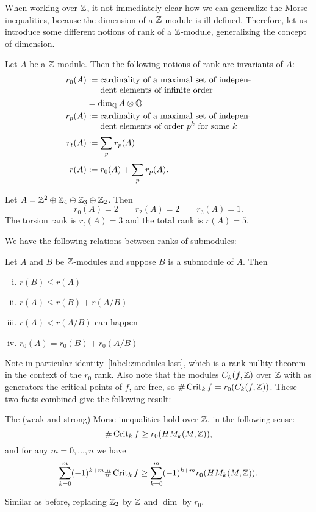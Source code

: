 When working over $\Z$, it not immediately clear how we can generalize the Morse inequalities, because the dimension of a $ \Z$-module is ill-defined.
Therefore, let us introduce some different notions of rank of a $\Z$-module, generalizing the concept of dimension.
\begin{definition}
    Let $A$ be a  $\Z$-module. Then the following notions of rank are invariants of $A$:
    \begin{align*}
        r_0(A) &:= \parbox[t]{6.2cm}{cardinality of a maximal set of independent elements of infinite order}\\[0.3em]
            &= \dim_{\Q} A \otimes \Q\\
        r_p(A) &:= \parbox[t]{6.2cm}{cardinality of a maximal set of independent elements of order $p^{k}$ for some $k$}\\[0.3em]
        r_t(A) &:= \sum_{p} r_p(A)\\[0.3em]
        r(A) &:= r_0(A) + \sum_{p}r_p(A)
    .\end{align*}
\end{definition}
\begin{eg}
    Let $A = \Z^2 \oplus \Z_4 \oplus \Z_3 \oplus \Z_2$.
    Then
    \[
        r_0(A) = 2 \qquad
        r_2(A) = 2 \qquad
        r_3(A) = 1
    .\]
    The torsion rank is $r_t(A) = 3$ and the total rank is $r(A) = 5$.
\end{eg}
We have the following relations between ranks of submodules:
\begin{lemma}
    Let $A$ and $B$ be $\Z$-modules and suppose $B$ is a submodule of $A$.
    Then
    \begin{enumerate}[(i)]
        \item $r(B) \le  r(A)$
        \item $r(A) \le  r(B) + r(A / B)$
        \item $r(A) < r(A / B)$ can happen
        \item  $ r_0(A) = r_0(B) + r_0(A/B)$ \label{label:zmodules-last}
    \end{enumerate}
\end{lemma}

Note in particular identity~\ref{label:zmodules-last}, which is a rank-nullity theorem in the context of the $r_0$ rank.
Also note that the modules $C_k(f, \Z)$ over $\Z$ with as generators the critical points of $f$, are free, so $\# \Crit_k f =r_0(C_k(f, \Z))$.
These two facts combined give the following result:
\begin{prop}
    The (weak and strong) Morse inequalities hold over $\Z$, in the following sense:
    \[
        \# \Crit_k f \ge  r_0(\HMf[k]{M, \Z})
    ,\]
    and for any $m = 0, \ldots, n$ we have
        \[
            \sum_{k=0}^{m} (-1)^{k+m} \# \Crit_k f \ge  \sum_{k=0}^{m} (-1)^{k+m} r_0(\HMf[k]{M, \Z})
        .\]
\end{prop}
\begin{myproof}
    Similar as before, replacing $\Z_2$ by $\Z$ and $\dim$ by $r_0$.
\end{myproof}




